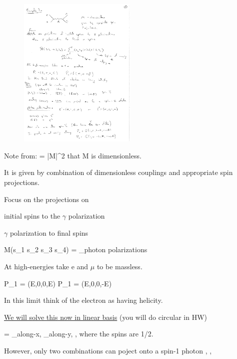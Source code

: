 {\begin{figure}[h]
\centering
\includegraphics[width=0.5\textwidth]{./eeToMuMu.pdf}
\end{figure}

Note from:
\be
{} =    |M|^2
\ee
that M is dimensionless. 

It is given by combination of dimensionless couplings and appropriate spin projections.


Focus on the projections on
\bi
\item[-] initial spins to the $\gamma$ polarization
\item[-] $\gamma$ polarization to final spins
\ei


\be
M(s_1 s_2 \rightarrow s_3 s_4) = \underbrace{\sum_\epsilon}_{\textrm{photon polarizations}} 
\ee

At high-energies take e and $\mu$ to be massless.


\be
P_1 = (E,0,0,E) \hspace*{1in}  P_1 = (E,0,0,-E)
\ee

In this limit think of the electron as having helicity. 


\underline{We will solve this now in linear basis} (you will do circular in HW)

\be
{} = \underbrace{\ket{\leftrightarrow \leftrightarrow}}_{\textrm{along-x}}, \underbrace{\ket{\updownarrow \updownarrow}}_{\textrm{along-y}}, \ket{\leftrightarrow \updownarrow}, \ket{\updownarrow \leftrightarrow}
\ee
where the spins are 1/2. 

However, only two combinations can poject onto a spin-1 photon
\be
\ket{\leftrightarrow \leftrightarrow}, \ket{\updownarrow \updownarrow}, 
\ee


}
